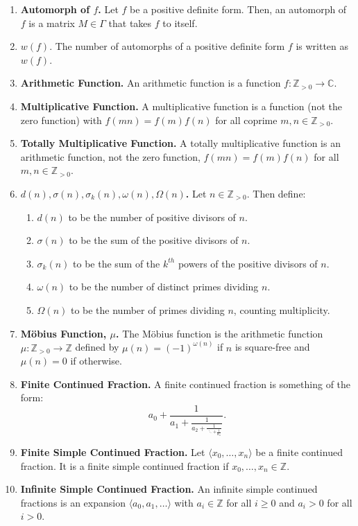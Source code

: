 \documentclass[12pt]{article}
\theoremstyle{definition}
\theoremstyle{named}
\begin{document}
\begin{enumerate}
    \item \textbf{Automorph of $f$. } Let $f$ be a positive definite form. Then, an automorph of $f$ is a matrix $M \in \Gamma$ that takes $f$ to itself. 
    \item \textbf{$w(f)$}. The number of automorphs of a positive definite form $f$ is written as $w(f)$. 
    \item \textbf{Arithmetic Function. } An arithmetic function is a function $f: \mathbb{Z}_{>0} \to \mathbb{C}$. 
    \item \textbf{Multiplicative Function. } A multiplicative function is a function (not the zero function) with $f(mn) = f(m)f(n)$ for all coprime $m,n \in \mathbb{Z}_{>0}$. 
    \item \textbf{Totally Multiplicative Function. } A totally multiplicative function is an arithmetic function, not the zero function, $f(mn) = f(m)f(n)$ for all $m,n \in \mathbb{Z}_{>0}$. 
    \item \textbf{$d(n), \sigma(n), \sigma_k(n), \omega(n), \Omega(n)$. } Let $n \in \mathbb{Z}_{>0}$. Then define: 
    \begin{enumerate}
        \item $d(n)$ to be the number of positive divisors of $n$. 
        \item $\sigma(n)$ to be the sum of the positive divisors of $n$. 
        \item $\sigma_k(n)$ to be the sum of the $k^{th}$ powers of the positive divisors of $n$. 
        \item $\omega(n)$ to be the number of distinct primes dividing $n$. 
        \item $\Omega(n)$ to be the number of primes dividing $n$, counting multiplicity. 
    \end{enumerate}
    \item \textbf{Möbius Function, $\mu$. } The Möbius function is the arithmetic function $\mu: \mathbb{Z}_{>0} \to \mathbb{Z}$ defined by $\mu(n) = (-1)^{\omega(n)}$ if $n$ is square-free and $\mu(n) = 0$ if otherwise. 
    \item \textbf{Finite Continued Fraction. } A finite continued fraction is something of the form: 
    $$
    a_0 + \frac{1}{a_1 + \frac{1}{a_2 + \frac{1}{\ddots + \frac{1}{a_n}}}}. 
    $$
    \item \textbf{Finite Simple Continued Fraction. } Let $\langle x_0,\dots,x_n \rangle$ be a finite continued fraction. It is a finite simple continued fraction if $x_0,\dots,x_n \in \mathbb{Z}$. 
    \item \textbf{Infinite Simple Continued Fraction. } An infinite simple continued fractions is an expansion $\langle a_0,a_1,\dots \rangle$ with $a_i \in \mathbb{Z}$ for all $i \geq 0$ and $a_i > 0$ for all $i > 0$. 

\end{enumerate}
\end{document}
